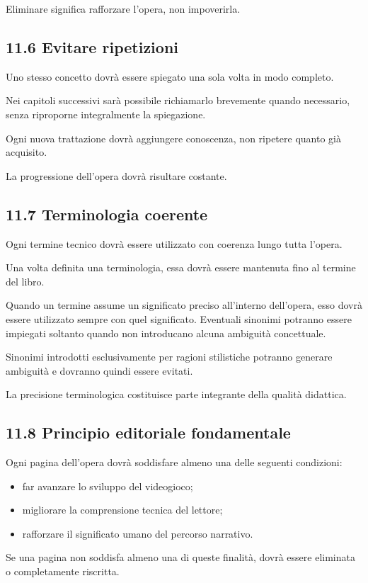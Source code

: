 \documentclass{article}
\begin{document}
Eliminare significa rafforzare l'opera, non impoverirla.

\subsection{11.6 Evitare ripetizioni}
Uno stesso concetto dovrà essere spiegato una sola volta in modo completo.

Nei capitoli successivi sarà possibile richiamarlo brevemente quando necessario, senza riproporne integralmente la
spiegazione.

Ogni nuova trattazione dovrà aggiungere conoscenza, non ripetere quanto già acquisito.

La progressione dell'opera dovrà risultare costante.

\subsection{11.7 Terminologia coerente}
Ogni termine tecnico dovrà essere utilizzato con coerenza lungo tutta l'opera.

Una volta definita una terminologia, essa dovrà essere mantenuta fino al termine del libro.

Quando un termine assume un significato preciso all'interno dell'opera, esso dovrà essere utilizzato sempre con quel
significato. Eventuali sinonimi potranno essere impiegati soltanto quando non introducano alcuna ambiguità concettuale.

Sinonimi introdotti esclusivamente per ragioni stilistiche potranno generare ambiguità e dovranno quindi essere evitati.

La precisione terminologica costituisce parte integrante della qualità didattica.

\subsection{11.8 Principio editoriale fondamentale}
Ogni pagina dell'opera dovrà soddisfare almeno una delle seguenti condizioni:

\begin{itemize}
\item far avanzare lo sviluppo del videogioco;
\item migliorare la comprensione tecnica del lettore;
\item rafforzare il significato umano del percorso narrativo.
\end{itemize}
Se una pagina non soddisfa almeno una di queste finalità, dovrà essere eliminata o completamente riscritta.
\end{document}
